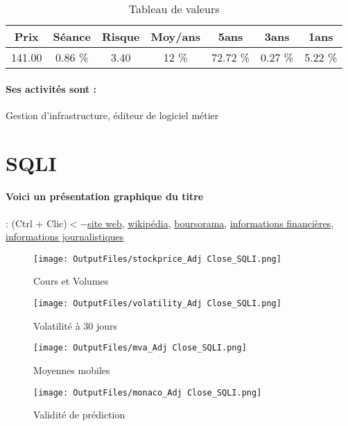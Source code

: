 \documentclass[11pt,a4paper]{report}%
\begin{document}
\begin{table}[H]
  \centering
    \begin{tabular}{|c|c|c|c|c|c|c|}
    \hline
    Prix & Séance & Risque  & Moy/ans & 5ans & 3ans & 1ans \\
    \hline
    141.00 &    0.86 \%    & 3.40 & 12 \% & 72.72 \% & 0.27 \% & 5.22 \% \\
    \hline
    \end{tabular}%
        \label{tab:table_SOPRA STERIA GROUP}%
      \caption{Tableau de valeurs}
\end{table}%

\paragraph{Ses activités sont : } Gestion d’infrastructure, éditeur de logiciel métier 
    
    \newpage

\section{SQLI}

\paragraph{Voici un présentation graphique du titre} : (Ctrl + Clic)$<-$\href{http://sqli.com/}{site web}, \href{https://fr.wikipedia.org/wiki/SQLI}{wikipédia}, \href{https://www.boursorama.com/cours/1rPSQI}{boursorama}, \href{https://www.qwant.com/?q=site:https:%2f%2fwww.easybourse.com%2faction-societe%2fSQLI&t=web&client=ext-firefox-hp}{informations financières}, \href{https://bourse.lerevenu.com/cours-de-bourse/fiche-valeur-synthese/SQLI/SQI-FR}{informations journalistiques}
\begin{figure}[!htb]
   \begin{minipage}{0.5\textwidth}
     \centering
     \texttt{[image: OutputFiles/stockprice\_Adj Close\_SQLI.png]}
     \caption{Cours et Volumes}\label{Fig:price_SQLI}
   \end{minipage}\hfill
   \begin{minipage}{0.5\textwidth}
     \centering
     \texttt{[image: OutputFiles/volatility\_Adj Close\_SQLI.png]}
     \caption{Volatilité à 30 jours}\label{Fig:volat_SQLI}
   \end{minipage}
\end{figure}
\begin{figure}[!htb]
   \begin{minipage}{0.5\textwidth}
     \centering
     \texttt{[image: OutputFiles/mva\_Adj Close\_SQLI.png]}
     \caption{Moyennes mobiles}\label{Fig:mva_SQLI}
   \end{minipage}\hfill
   \begin{minipage}{0.5\textwidth}
     \centering
     \texttt{[image: OutputFiles/monaco\_Adj Close\_SQLI.png]}
     \caption{Validité de prédiction}\label{Fig:prediction_SQLI}
   \end{minipage}
\end{figure}
\end{document}
